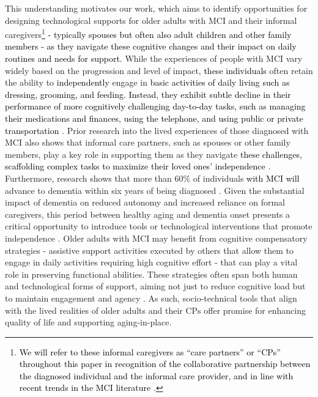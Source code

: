 \documentclass[acmsmall]{acmart}
\begin{document}
This understanding motivates our work, which aims to identify opportunities for designing technological supports for older adults with MCI and their informal caregivers\textcolor{black}{\footnote{\textcolor{black}{We will refer to these informal caregivers as “care partners” or “CPs” throughout this paper in recognition of the collaborative partnership between the diagnosed individual and the informal care provider, and in line with recent trends in the MCI literature \cite{mathur2022collaborative, zubatiy2021empowering, zubatiy2023don}.}}} \textcolor{black}{- typically spouses but often also adult children and other family members - \textcolor{black}{as they} navigate these cognitive changes and their impact on daily routines and needs for support.}
While the experiences of people with MCI vary widely based on the progression and level of impact, \textcolor{black}{these individuals} often retain the ability to \textcolor{black}{independently} engage in \textcolor{black}{basic activities of daily living such as dressing, grooming, and feeding. Instead, they exhibit subtle decline in their performance of more cognitively challenging day-to-day tasks, such as managing their medications and finances, using the telephone, and using public or private transportation} \cite{petersen1997aging}. Prior research into the lived experiences of those diagnosed with MCI also shows that informal care partners, such as spouses or other family members, play a key role in supporting them as they navigate \textcolor{black}{these challenges, scaffolding complex tasks to maximize their loved ones’ independence} \cite{mank2023determinants}. Furthermore, research shows that more than 60\% of individuals \textcolor{black}{with MCI will} advance to dementia within six years of being diagnosed \cite{busse2006progression}. Given the substantial impact of dementia on reduced autonomy and increased reliance on formal caregivers, this period between healthy aging and dementia onset presents a critical opportunity to introduce tools or technological interventions that promote independence \cite{anderson2019state, liang2019optimal}. Older adults with MCI may benefit from cognitive compensatory strategies - assistive support activities executed by others that allow them to engage in daily activities requiring high cognitive effort - that can play a vital role in preserving functional abilities. These strategies often span both human and technological forms of support, aiming not just to reduce cognitive load but to maintain engagement and agency \cite{mathur2022collaborative, sherman2017efficacy}. As such, socio-technical tools that align with the lived realities of older adults and their CPs offer promise for enhancing quality of life and supporting aging-in-place.
\end{document}

